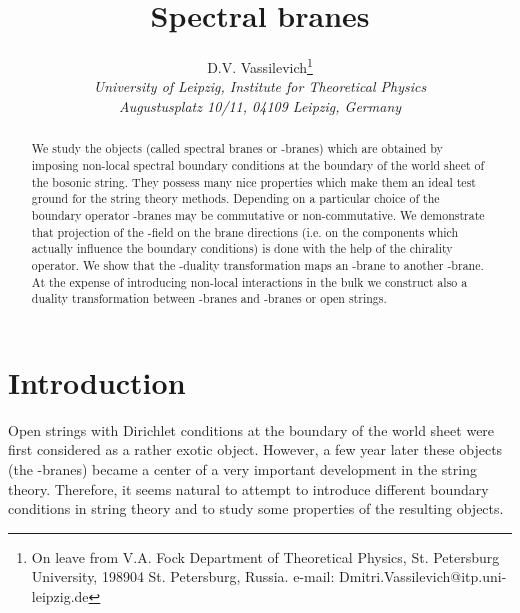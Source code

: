 \documentclass[a4paper,12pt,twoside]{article}
\begin{document}
\title{Spectral branes}
\author{D.V. Vassilevich\thanks{On leave from V.A. Fock
Department of Theoretical Physics,
     St. Petersburg University,
     198904 St. Petersburg, Russia.
     e-mail: Dmitri.Vassilevich@itp.uni-leipzig.de} \\
{\it University of Leipzig, Institute for Theoretical Physics}\\
{\it  Augustusplatz 10/11, 04109 Leipzig, Germany}}

\maketitle

\begin{abstract}
We study the objects (called spectral branes or \coordHE{}-branes)
which are obtained by imposing non-local spectral boundary
conditions at the boundary of the world sheet of the bosonic
string. They possess many nice properties
which make them an ideal test ground for the string theory methods.
Depending on a particular choice of the boundary
operator \coordHE{}-branes may be commutative or non-commutative.
We demonstrate that projection of the \coordHE{}-field 
on the brane directions (i.e. on the components
which actually influence the boundary conditions) is done with the help of the
chirality operator.
We show that the \coordHE{}-duality transformation maps an
\coordHE{}-brane to another \coordHE{}-brane. At the expense of introducing
non-local interactions in the bulk we construct also
a duality transformation between \coordHE{}-branes and \coordHE{}-branes
or open strings.
\end{abstract}

\section{Introduction}
Open strings with Dirichlet conditions at the boundary
of the world sheet \cite{Dai:1989ua,Leigh:1989jq} were
first considered as a rather exotic object. However,
a few year later \cite{Polchinski:1995mt} these objects
(the \coordHE{}-branes) became a center of a very important
development in the string theory. Therefore, it seems
natural to attempt to introduce different boundary
conditions in string theory and to study some properties
of the resulting objects.
\end{document}
